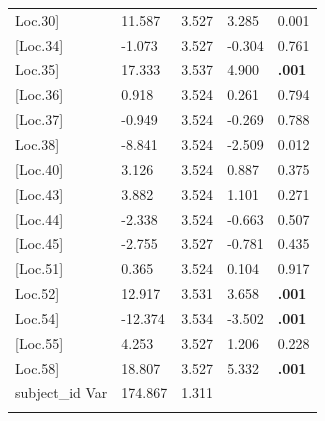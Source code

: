 \begin{longtable}{p{4cm}p{2cm}p{2cm}p{2cm}l}
	 \setrow{\bfseries}{[}Loc.30{]} & \setrow{\bfseries} 11.587  & \setrow{\bfseries} 3.527 & \setrow{\bfseries} 3.285  & \setrow{\bfseries} 0.001   \\
	{[}Loc.34{]} & -1.073  & 3.527 & -0.304 & 0.761   \\
	 \setrow{\bfseries}{[}Loc.35{]} & \setrow{\bfseries} 17.333  & \setrow{\bfseries} 3.537 & \setrow{\bfseries} 4.900  & \setrow{\bfseries} \textbf{\boldmath{\textless}.001} \\
	{[}Loc.36{]} & 0.918   & 3.524 & 0.261  & 0.794 \\
	{[}Loc.37{]} & -0.949  & 3.524 & -0.269 & 0.788 \\
	 \setrow{\bfseries}{[}Loc.38{]} & \setrow{\bfseries} -8.841  & \setrow{\bfseries} 3.524 & \setrow{\bfseries} -2.509 & \setrow{\bfseries} 0.012   \\
	{[}Loc.40{]} & 3.126   & 3.524 & 0.887  & 0.375 \\
	{[}Loc.43{]} & 3.882   & 3.524 & 1.101  & 0.271 \\
	{[}Loc.44{]} & -2.338  & 3.524 & -0.663 & 0.507 \\
	{[}Loc.45{]} & -2.755  & 3.527 & -0.781 & 0.435 \\
	{[}Loc.51{]} & 0.365   & 3.524 & 0.104  & 0.917 \\
	 \setrow{\bfseries}{[}Loc.52{]} & \setrow{\bfseries} 12.917  & \setrow{\bfseries} 3.531 & \setrow{\bfseries} 3.658  & \setrow{\bfseries} \textbf{\boldmath{\textless}.001}   \\
	 \setrow{\bfseries}{[}Loc.54{]} & \setrow{\bfseries} -12.374 & \setrow{\bfseries} 3.534 & \setrow{\bfseries} -3.502 & \setrow{\bfseries} \textbf{\boldmath{\textless}.001}   \\
	{[}Loc.55{]} & 4.253   & 3.527 & 1.206  & 0.228   \\
	 \setrow{\bfseries}{[}Loc.58{]} & \setrow{\bfseries} 18.807  & \setrow{\bfseries} 3.527 & \setrow{\bfseries} 5.332  & \setrow{\bfseries} \textbf{\boldmath{\textless}.001}   \\
	 subject\_id Var & 174.867 & 1.311 & {} & {} \\
	\hiderowcolors \hline \hline
	\label{tab:angle_loc}
\end{longtable}


